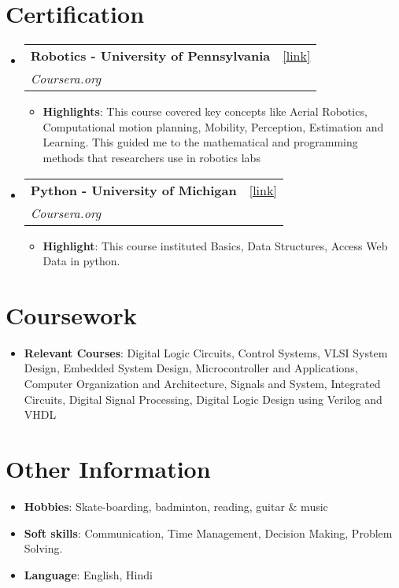 \documentclass[letterpaper,11pt]{article}
\makeatletter
\newcommand{\resumeItem}[2]{
  \item\small{
    \textbf{#1}{: #2 \vspace{-2pt}}
  }
}
\newcommand{\resumeSubheading}[4]{
  \vspace{-1pt}\item
    \begin{tabular*}{0.97\textwidth}{l@{\extracolsep{\fill}}r}
      \textbf{#1} & #2 \\
      \textit{\small#3} & \textit{\small #4} \\
    \end{tabular*}\vspace{-5pt}
}
\newcommand{\resumeSubHeadingListStart}{\begin{itemize}[leftmargin=*]}
\newcommand{\resumeSubHeadingListEnd}{\end{itemize}}
\newcommand{\resumeItemListStart}{\begin{itemize}}
\newcommand{\resumeItemListEnd}{\end{itemize}\vspace{-5pt}}
\makeatother
\begin{document}
\section{Certification}
  \resumeSubHeadingListStart
    \resumeSubheading
      {Robotics - University of Pennsylvania}{\href{https://coursera.org}{[link]}}
      {Coursera.org}{}
      \resumeItemListStart
        \resumeItem{Highlights}
          {This course covered key concepts like Aerial Robotics, Computational motion planning, Mobility, Perception, Estimation and Learning.
          This guided me to the mathematical and programming methods that researchers use in robotics labs}
      \resumeItemListEnd
    
    \resumeSubheading
      {Python - University of Michigan}{\href{https://www.coursera.org/account/accomplishments/certificate/SWCNNDVNW9Y9}{[link]}}
      {Coursera.org}{}
      \resumeItemListStart
        \resumeItem{Highlight}
          {This course instituted Basics, Data Structures, Access Web Data in python.}
      \resumeItemListEnd
  \resumeSubHeadingListEnd

\section{Coursework}
  \resumeSubHeadingListStart
      \resumeItemListStart
        \resumeItem{Relevant Courses}{Digital Logic Circuits, Control Systems, VLSI System Design, Embedded System Design, Microcontroller and Applications, Computer Organization and Architecture, Signals and System, Integrated Circuits, Digital Signal Processing, Digital Logic Design using Verilog and VHDL}
      \resumeItemListEnd
  \resumeSubHeadingListEnd

\section{Other Information}
  \resumeSubHeadingListStart
      \resumeItemListStart
        \resumeItem{Hobbies}{Skate-boarding, badminton, reading, guitar \& music}
        \resumeItem{Soft skills}{Communication, Time Management, Decision Making, Problem Solving.}
        \resumeItem{Language}{English, Hindi}
      \resumeItemListEnd
  \resumeSubHeadingListEnd
\end{document}
